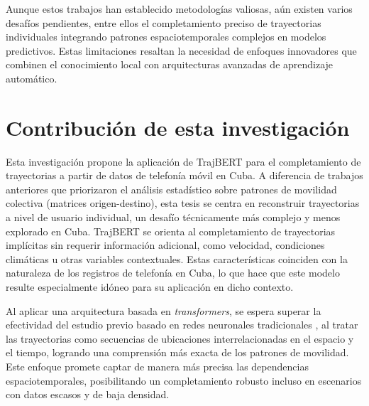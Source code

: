 Aunque estos trabajos han establecido metodologías valiosas, aún existen varios desafíos pendientes, entre ellos el completamiento preciso de trayectorias individuales integrando patrones espaciotemporales complejos en modelos predictivos. Estas limitaciones resaltan la necesidad de enfoques innovadores que combinen el conocimiento local con arquitecturas avanzadas de aprendizaje automático.

\section{Contribución de esta investigación}

Esta investigación propone la aplicación de TrajBERT para el completamiento de trayectorias a partir de datos de telefonía móvil en Cuba. A diferencia de trabajos anteriores que priorizaron el análisis estadístico sobre patrones de movilidad colectiva (matrices origen-destino), esta tesis se centra en reconstruir trayectorias a nivel de usuario individual, un desafío técnicamente más complejo y menos explorado en Cuba. TrajBERT se orienta al completamiento de trayectorias implícitas sin requerir información adicional, como velocidad, condiciones climáticas u otras variables contextuales. Estas características coinciden con la naturaleza de los registros de telefonía en Cuba, lo que hace que este modelo resulte especialmente idóneo para su aplicación en dicho contexto.

Al aplicar una arquitectura basada en \textit{transformers}, se espera superar la efectividad del estudio previo basado en redes neuronales tradicionales \cite{rodriguez2022movilidad}, al tratar las trayectorias como secuencias de ubicaciones interrelacionadas en el espacio y el tiempo, logrando una comprensión más exacta de los patrones de movilidad. Este enfoque promete captar de manera más precisa las dependencias espaciotemporales, posibilitando un completamiento robusto incluso en escenarios con datos escasos y de baja densidad.